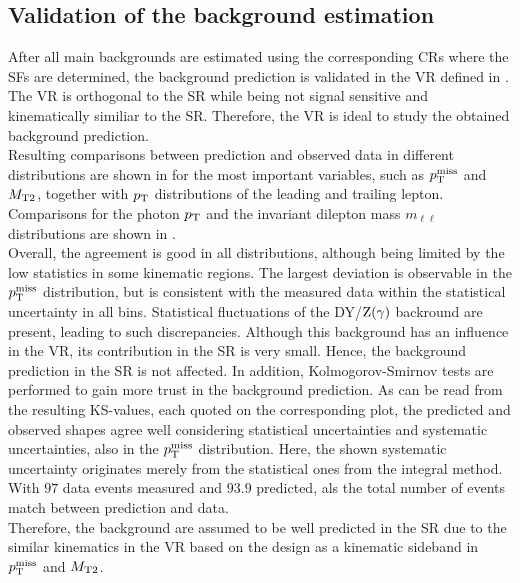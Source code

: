 \FloatBarrier
\subsection{Validation of the background estimation}\label{sec:Validation}
After all main backgrounds are estimated using the corresponding CRs where the SFs are determined, the background prediction is validated in the VR defined in . The VR is orthogonal to the SR while being not signal sensitive and kinematically similiar to the SR. Therefore, the VR is ideal to study the obtained background prediction.\\
Resulting comparisons between prediction and observed data in different distributions are shown in  for the most important variables, such as $p_{\mathrm{T}}^\text{miss}$ and $M_{\mathrm{T2}}$, together with $p_{\mathrm{T}}$ distributions of the leading and trailing lepton. Comparisons for the photon $p_{\mathrm{T}}$ and the invariant dilepton mass $m_{\ell\ell}$ distributions are shown in .\\
Overall, the agreement is good in all distributions, although being limited by the low statistics in some kinematic regions. The largest deviation is observable in the $p_{\mathrm{T}}^\text{miss}$ distribution, but is consistent with the measured data within the statistical uncertainty in all bins. Statistical fluctuations of the DY/$\mathrm{Z}(\gamma)$ backround are present, leading to such discrepancies. Although this background has an influence in the VR, its contribution in the SR is very small. Hence, the background prediction in the SR is not affected. In addition, Kolmogorov-Smirnov tests are performed to gain more trust in the background prediction. As can be read from the resulting KS-values, each quoted on the corresponding plot, the predicted and observed shapes agree well considering statistical uncertainties and systematic uncertainties, also in the $p_{\mathrm{T}}^\text{miss}$ distribution. Here, the shown systematic uncertainty originates merely from the statistical ones from the integral method. With $97$ data events measured and $93.9$ predicted, als the total number of events match between prediction and data.\\
Therefore, the background are assumed to be well predicted in the SR due to the similar kinematics in the VR based on the design as a kinematic sideband in $p_{\mathrm{T}}^\text{miss}$ and $M_{\mathrm{T2}}$.
